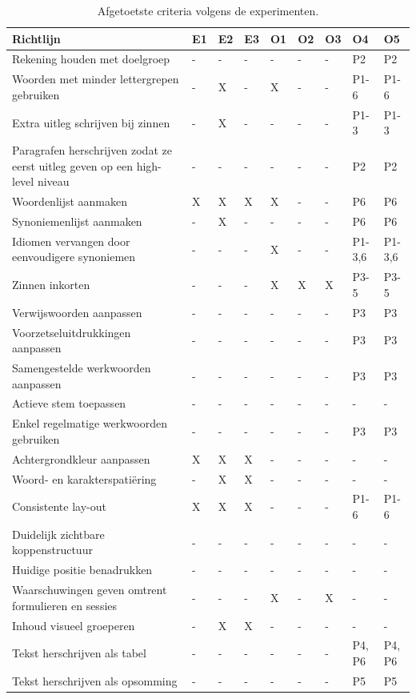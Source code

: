 \begin{table}[H]
	\centering
\begin{tabular}{ | m{8cm} | m{0.5cm} | m{0.5cm} | m{0.5cm} | m{0.5cm} | m{0.5cm} | m{0.5cm} | m{1cm} | m{1cm} | }
		\hline
		Richtlijn & E1 & E2 & E3 & O1 & O2 & O3 & O4 & O5 \\ \hline
		Rekening houden met doelgroep & - & - & - & - & - & - & P2 & P2 \\ \hline
		Woorden met minder lettergrepen gebruiken & - & X & - & X & - & - & P1-6 & P1-6 \\ \hline
		Extra uitleg schrijven bij zinnen & - & X & - & - & - & - & P1-3 & P1-3 \\ \hline
		Paragrafen herschrijven zodat ze eerst uitleg geven op een high-level niveau & - & - & - & - & - & - & P2 & P2 \\ \hline
		Woordenlijst aanmaken & X & X & X & X & - & - & P6 & P6 \\ \hline
		Synoniemenlijst aanmaken & - & X & - & - & - & - & P6 & P6 \\ \hline
		Idiomen vervangen door eenvoudigere synoniemen & - & - & - & X & - & - & P1-3,6 & P1-3,6 \\ \hline
		Zinnen inkorten & - & - & - & X & X & X & P3-5 & P3-5 \\ \hline
		Verwijswoorden aanpassen & - & - & - & - & - & - & P3 & P3 \\ \hline
		Voorzetseluitdrukkingen aanpassen & - & - & - & - & - & - & P3 & P3 \\ \hline
		Samengestelde werkwoorden aanpassen & - & - & - & - & - & - & P3 & P3 \\ \hline
		Actieve stem toepassen & - & - & - & - & - & - & - & - \\ \hline
		Enkel regelmatige werkwoorden gebruiken & - & - & - & - & - & - & P3 & P3 \\ \hline
		Achtergrondkleur aanpassen & X & X & X & - & - & - & - & - \\ \hline
		Woord- en karakterspatiëring & - & X & X & - & - & - & - & - \\ \hline
		Consistente lay-out & X & X & X & - & - & - & P1-6 & P1-6 \\ \hline
		Duidelijk zichtbare koppenstructuur & - & - & - & - & - & - & - & - \\ \hline
		Huidige positie benadrukken & - & - & - & - & - & - & - & - \\ \hline
		Waarschuwingen geven omtrent formulieren en sessies & - & - & - & X & - & X & - & - \\ \hline
		Inhoud visueel groeperen & - & X & X & - & - & - & - & - \\ \hline
		Tekst herschrijven als tabel & - & - & - & - & - & - & P4, P6 & P4, P6 \\ \hline
		Tekst herschrijven als opsomming & - & - & - & - & - & - & P5 & P5 \\ \hline
	\end{tabular}
\label{table:afgetoetste-criteria}
\caption{Afgetoetste criteria volgens de experimenten.}
\end{table}


